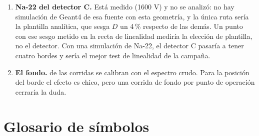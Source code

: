 \documentclass[11pt,a4paper]{article}
\begin{document}
\begin{enumerate}
\item \textbf{Na-22 del detector C.} Está medido (1600 V) y no se analizó: no
      hay simulación de Geant4 de esa fuente con esta geometría, y la única
      ruta sería la plantilla analítica, que sesga $D$ un 4\,\% respecto de las
      demás. Un punto con ese sesgo metido en la recta de linealidad mediría la
      elección de plantilla, no el detector. Con una simulación de Na-22, el
      detector C pasaría a tener cuatro bordes y sería el mejor test de
      linealidad de la campaña.

\item \textbf{El fondo.} \NSinFondo{} de las \NCorridas{} corridas se calibran
      con el espectro crudo. Para la posición del borde el efecto es chico,
      pero una corrida de fondo por punto de operación cerraría la duda.
\end{enumerate}




\appendix
\section{Glosario de símbolos}
\label{ap:glosario}
\end{document}
